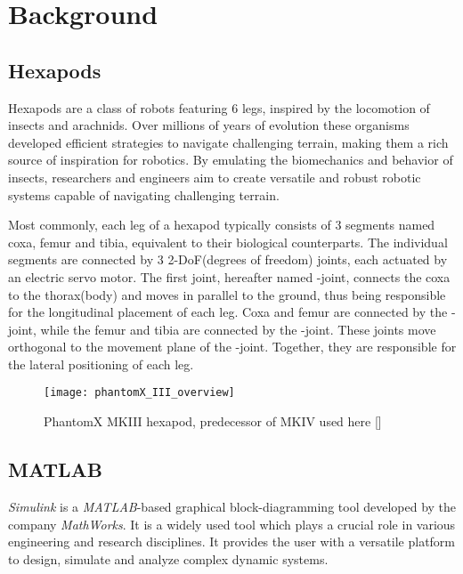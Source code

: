 \chapter{Background}
\label{ch:background}

\section{Hexapods}
Hexapods are a class of robots featuring 6 legs, inspired by the locomotion of insects and arachnids.
Over millions of years of evolution these organisms developed efficient strategies to navigate challenging terrain, making them a rich source of inspiration for robotics.
By emulating the biomechanics and behavior of insects, researchers and engineers aim to create versatile and robust robotic systems capable of navigating challenging terrain.

Most commonly, each leg of a hexapod typically consists of 3 segments named coxa, femur and tibia, equivalent to their biological counterparts.
The individual segments are connected by 3 2-DoF(degrees of freedom) joints, each actuated by an electric servo motor.
The first joint, hereafter named \textalpha-joint, connects the coxa to the thorax(body) and moves in parallel to the ground, thus being responsible for the longitudinal placement of each leg.
Coxa and femur are connected by the \textbeta-joint, while the femur and tibia are connected by the \textgamma-joint. 
These joints move orthogonal to the movement plane of the \textalpha-joint. Together, they are responsible for the lateral positioning of each leg.

\begin{figure}[h]
	\centerline{\texttt{[image: phantomX\_III\_overview]}}
	\caption{PhantomX MKIII hexapod, predecessor of MKIV used here [\cite{PhantomX_MKIII}]}
	\label{figure: PhantomX MKIII}
\end{figure}




\section{MATLAB}
\textit{Simulink\textsuperscript{\textregistered}} is a \textit{MATLAB\textsuperscript{\textregistered}}-based graphical block-diagramming tool developed by the company \textit{MathWorks\textsuperscript{\textregistered}}. 
It is a widely used tool which plays a crucial role in various engineering and research disciplines.
It provides the user with a versatile platform to design, simulate and analyze complex dynamic systems.

